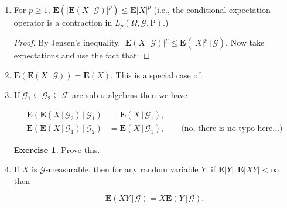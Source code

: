 \documentclass[11pt]{report}
\theoremstyle{plain}
\theoremstyle{definition}
\newtheorem{xexercise}[thm]{Exercise}
\begin{document}
\begin{enumerate}[label=\arabic*.]
\begin{proof}
The proof is similar to the non-conditional case, with a small twist: we observe that $\varphi(x)$ is a supremum of a countable number of linear functions, namely

\[
\varphi(x) = \sup \{ ax+b\,:\,a,b\in \mathbb{Q}, ax+b\le \varphi(x)\textrm{ for all }x\},
\]

then continue as in the original proof. The restriction to a countable number of linear functions is necessary since all statements pertaining to conditional expectations are almost sure statements, which means that there is an exceptional $0$-probability set being discarded, and we can only allow a countable number of these.
\end{proof}
\item For $p\ge 1$, $\mathbf{E}\left( \left|\mathbf{E}\left(X\,|\,\mathcal{G}\right)\right|^p \right) \le \mathbf{E}|X|^p$ (i.e., the conditional expectation operator is a contraction in $L_p(\Omega,\mathcal{G},\mathrm{P})$.)

\begin{proof}
By Jensen's inequality, $|\mathbf{E}\left(X\,|\,\mathcal{G}\right)|^p \le \mathbf{E}\left(|X|^p\,|\,\mathcal{G}\right)$. Now take expectations and use the fact that:
\end{proof}
\item $\mathbf{E}(\mathbf{E}\left(X\,|\,\mathcal{G}\right)) = \mathbf{E}(X)$. This is a special case of:
\item If $\mathcal{G}_1\subseteq \mathcal{G}_2 \subseteq \mathcal{F}$ are sub-$\sigma$-algebras then we have

\begin{align*}
\mathbf{E}\left(\mathbf{E}\left(X\,|\,\mathcal{G}_2\right)\,|\,\mathcal{G}_1\right) &= \mathbf{E}\left(X\,|\,\mathcal{G}_1\right), \\
\mathbf{E}\left(\mathbf{E}\left(X\,|\,\mathcal{G}_1\right)\,|\,\mathcal{G}_2\right) &= \mathbf{E}\left(X\,|\,\mathcal{G}_1\right),
\qquad  \textrm{(no, there is no typo here\ldots)}
\end{align*}

\begin{xexercise}
Prove this.
\end{xexercise}
\item If $X$ is $\mathcal{G}$-measurable, then for any random variable $Y$, if $\mathbf{E}|Y|, \mathbf{E}|XY|<\infty$ then

\[
\mathbf{E}\left(XY\,|\,\mathcal{G}\right) = X \mathbf{E}\left(Y\,|\,\mathcal{G}\right).
\]


\end{enumerate}
\end{document}
